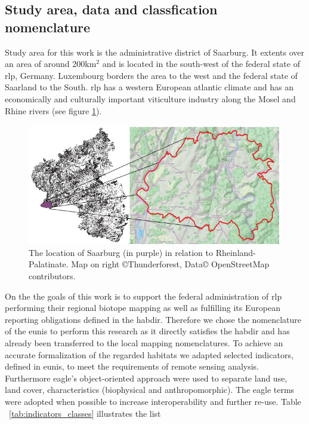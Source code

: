 \documentclass[authoryear,final,12pt,number]{elsarticle}
\begin{document}
\subsection{Study area, data and classfication nomenclature}
\label{sec:usecase_data}
Study area for this work is the administrative district of Saarburg. It extents
over an area of around 200km$^{2}$ and is
located in the south-west of the federal state of \gls{rlp}, Germany.
Luxembourg borders the area to the west and the federal state of Saarland to the
South. \gls{rlp} has a western European atlantic climate and has an economically
and culturally important viticulture industry along the Mosel and Rhine rivers
(see figure \ref{fig:study_area}).
\begin{figure}
    \includegraphics[width=\textwidth]{diagrams/study_area_closeup.png}
    \caption{The location of Saarburg (in purple) in relation to
    Rheinland-Palatinate. Map on right \copyright Thunderforest, Data\copyright
    OpenStreetMap contributors.}
\label{fig:study_area}
\end{figure}
On the the goals of this work is to support the federal administration of
\gls{rlp} performing their regional biotope mapping as well as fulfilling its
European reporting obligations defined in the \gls{habdir}. Therefore we chose
the nomenclature of the \gls{eunis} to perform this research as it directly
satisfies the \gls{habdir} and has already been transferred to the local mapping
nomenclatures. To achieve an accurate formalization of the regarded habitats we
adapted selected indicators, defined in \gls{eunis}, to meet the requirements of
remote sensing analysis. Furthermore \gls{eagle}'s object-oriented
approach were used to separate land use, land cover, characteristics
(biophysical and anthropomorphic). The \gls{eagle} terms were adopted when
possible to increase interoperability and further re-use. Table
~\ref{tab:indicators_classes} illustrates the list
\end{document}
